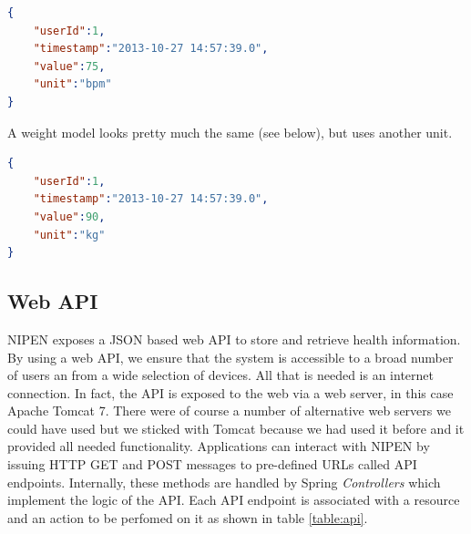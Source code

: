 \begin{lstlisting}[language=json]
{
	"userId":1,
	"timestamp":"2013-10-27 14:57:39.0",
	"value":75,
	"unit":"bpm"
}
\end{lstlisting}

A weight model looks pretty much the same (see below), but uses another unit.

\begin{lstlisting}[language=json]
{
	"userId":1,
	"timestamp":"2013-10-27 14:57:39.0",
	"value":90,
	"unit":"kg"
}
\end{lstlisting} 

\subsection{Web API}
\label{subsec:api}

NIPEN exposes a JSON based web API to store and retrieve health information.
By using a web API, we ensure that the system is accessible to a broad number of users an from a wide
selection of devices. All that is needed is an internet connection.
In fact, the API is exposed to the web via a web server, in this case Apache Tomcat 7.
There were of course a number of alternative web servers we could have used but we sticked
with Tomcat because we had used it before and it provided all needed functionality.
Applications can interact with NIPEN by issuing HTTP GET and POST messages to pre-defined URLs
called API endpoints.
Internally, these methods are handled by Spring \textit{Controllers} which implement the logic of the API.
Each API endpoint is associated with a resource and an action to be perfomed on it as shown in table \ref{table:api}.

